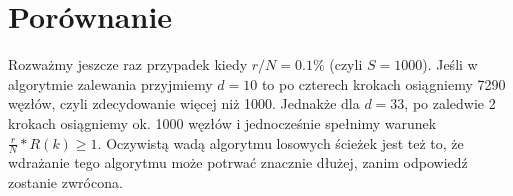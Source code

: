 \documentclass[10pt, a4paper]{article}
\begin{document}
\section*{Porównanie}
Rozważmy jeszcze raz przypadek kiedy  $r/N = 0.1\%$ (czyli $S = 1000$). Jeśli w algorytmie zalewania przyjmiemy $d=10$ to po czterech krokach  osiągniemy 7290 węzłów, czyli zdecydowanie więcej niż 1000. Jednakże dla $d=33$, po zaledwie 2 krokach osiągniemy ok. 1000 węzłów i jednocześnie spełnimy warunek  $\frac{r}{N}*R(k) \geq 1 $. Oczywistą wadą algorytmu losowych ścieżek jest też to, że wdrażanie tego algorytmu może potrwać znacznie dłużej, zanim odpowiedź zostanie zwrócona.
\end{document}
